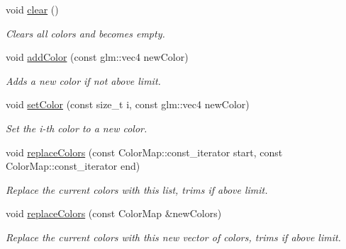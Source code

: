 \begin{DoxyCompactItemize}
void \mbox{\hyperlink{classpepr3d_1_1_color_manager_adb8aeb957d6a1cd5a79ebc0e246f5ca7}{clear}} ()
\begin{DoxyCompactList}\small\item\em Clears all colors and becomes empty. \end{DoxyCompactList}\item 
\mbox{\label{classpepr3d_1_1_color_manager_a5ddc4ed221439f8b744b6d85b89127b3}} 
void \mbox{\hyperlink{classpepr3d_1_1_color_manager_a5ddc4ed221439f8b744b6d85b89127b3}{add\+Color}} (const glm\+::vec4 new\+Color)
\begin{DoxyCompactList}\small\item\em Adds a new color if not above limit. \end{DoxyCompactList}\item 
\mbox{\label{classpepr3d_1_1_color_manager_a3f11321a8da932e4bf9f7d9a83ecc7f1}} 
void \mbox{\hyperlink{classpepr3d_1_1_color_manager_a3f11321a8da932e4bf9f7d9a83ecc7f1}{set\+Color}} (const size\+\_\+t i, const glm\+::vec4 new\+Color)
\begin{DoxyCompactList}\small\item\em Set the i-\/th color to a new color. \end{DoxyCompactList}\item 
\mbox{\label{classpepr3d_1_1_color_manager_add375baf3a503d79d4922dbd360b62af}} 
void \mbox{\hyperlink{classpepr3d_1_1_color_manager_add375baf3a503d79d4922dbd360b62af}{replace\+Colors}} (const Color\+Map\+::const\+\_\+iterator start, const Color\+Map\+::const\+\_\+iterator end)
\begin{DoxyCompactList}\small\item\em Replace the current colors with this list, trims if above limit. \end{DoxyCompactList}\item 
\mbox{\label{classpepr3d_1_1_color_manager_a2393992e48c2c6715ac33cb067d3dc75}} 
void \mbox{\hyperlink{classpepr3d_1_1_color_manager_a2393992e48c2c6715ac33cb067d3dc75}{replace\+Colors}} (const Color\+Map \&new\+Colors)
\begin{DoxyCompactList}\small\item\em Replace the current colors with this new vector of colors, trims if above limit. \end{DoxyCompactList}\item 

\end{DoxyCompactItemize}
